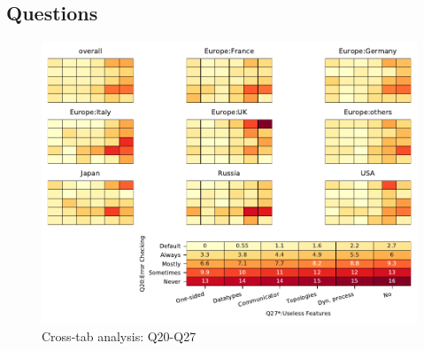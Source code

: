 
\subsection{Questions}


\begin{figure}
\begin{center}
\includegraphics[width=12cm]{../pdfs/Q20-Q27.pdf}
\caption{Cross-tab analysis: Q20-Q27}
\label{fig:Q20-Q27}
\end{center}
\end{figure}
